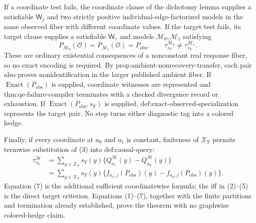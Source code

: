 If a coordinate test fails, the coordinate clause of the dichotomy lemma supplies a satisfiable \(\mathsf W_j\) and two strictly positive individual-edge-factorized models in the same observed fiber with different coordinate values.  If the target test fails, its target clause supplies a satisfiable \(\mathsf W_\tau\) and models \(\mathcal M_0,\mathcal M_1\) satisfying
\[
P_{\mathcal M_0}(\mathcal O)=P_{\mathcal M_1}(\mathcal O)=P_{\mathrm{obs}},
\qquad
\tau_{s_Y}^{\mathcal M_0}\neq\tau_{s_Y}^{\mathcal M_1}.
\tag{6}
\]
These are ordinary existential consequences of a nonconstant real response fiber, so no exact encoding is required.  By \(\text{prop:ambient-nonrecovery-transfer}\), each pair also proves nonidentification in the larger published ambient fiber.  If \(\operatorname{Exact}(P_{\mathrm{obs}})\) is supplied, coordinate witnesses are represented and \(\text{thm:qe-failure-compiler}\) terminates with a checked divergence record or exhaustion.  If \(\operatorname{Exact}(P_{\mathrm{obs}},s_Y)\) is supplied, \(\text{def:exact-observed-specialization}\) represents the target pair.  No step turns either diagnostic tag into a colored hedge.

Finally, if every coordinate at \(a_0\) and \(a_1\) is constant, finiteness of \(\mathcal X_Y\) permits termwise substitution of (3) into \(\text{def:causal-query}\):
\[
\begin{aligned}
\tau_{s_Y}^{\mathcal M}
&=\sum_{y\in\mathcal X_Y}s_Y(y)
\{Q_{a_1}^{\mathcal M}(y)-Q_{a_0}^{\mathcal M}(y)\}\\
&=\sum_{y\in\mathcal X_Y}s_Y(y)
\{f_{a_1,j}(P_{\mathrm{obs}})(y)-f_{a_0,j}(P_{\mathrm{obs}})(y)\}.
\end{aligned}
\tag{7}
\]
Equation (7) is the additional sufficient coordinatewise formula; the iff in (2)--(5) is the direct target criterion.  Equations (1)--(7), together with the finite partitions and termination already established, prove the theorem with no graphwise colored-hedge claim.